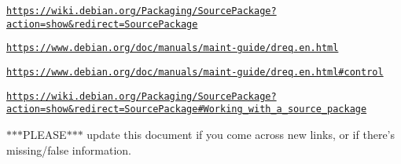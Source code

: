 \href{https://wiki.debian.org/Packaging/SourcePackage?action=show&redirect=SourcePackage}{\tt https\-://wiki.\-debian.\-org/\-Packaging/\-Source\-Package?action=show\&redirect=\-Source\-Package}

\href{https://www.debian.org/doc/manuals/maint-guide/dreq.en.html}{\tt https\-://www.\-debian.\-org/doc/manuals/maint-\/guide/dreq.\-en.\-html}

\href{https://www.debian.org/doc/manuals/maint-guide/dreq.en.html#control}{\tt https\-://www.\-debian.\-org/doc/manuals/maint-\/guide/dreq.\-en.\-html\#control}

\href{https://wiki.debian.org/Packaging/SourcePackage?action=show&redirect=SourcePackage#Working_with_a_source_package}{\tt https\-://wiki.\-debian.\-org/\-Packaging/\-Source\-Package?action=show\&redirect=\-Source\-Package\#\-Working\-\_\-with\-\_\-a\-\_\-source\-\_\-package}

$\ast$$\ast$$\ast$\-P\-L\-E\-A\-S\-E$\ast$$\ast$$\ast$ update this document if you come across new links, or if there's missing/false information. 
